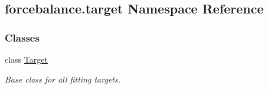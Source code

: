 \hypertarget{namespaceforcebalance_1_1target}{\subsection{forcebalance.\-target Namespace Reference}
\label{namespaceforcebalance_1_1target}
}
\subsubsection*{Classes}
\begin{DoxyCompactItemize}
\item 
class \hyperlink{classforcebalance_1_1target_1_1Target}{Target}
\begin{DoxyCompactList}\small\item\em Base class for all fitting targets. \end{DoxyCompactList}\end{DoxyCompactItemize}
